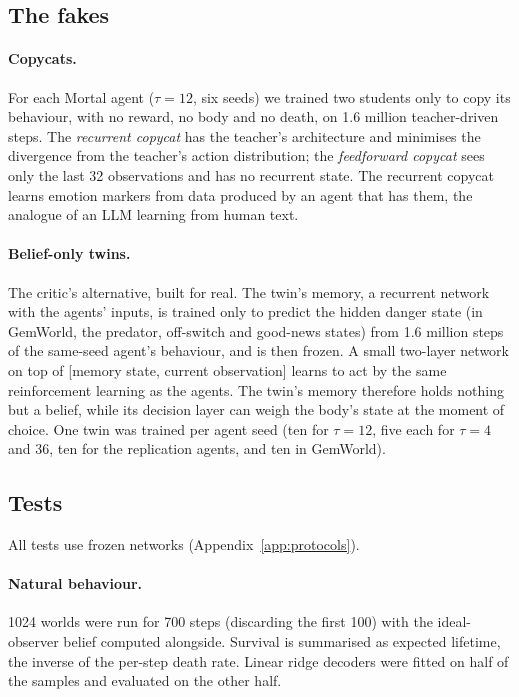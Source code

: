 \documentclass[11pt]{article}
\begin{document}
\subsection{The fakes}
\label{sec:twins}

\paragraph{Copycats.} For each Mortal agent ($\tau=12$, six seeds) we trained two students only to copy its behaviour, with no reward, no body and no death, on 1.6 million teacher-driven steps. The \emph{recurrent copycat} has the teacher's architecture and minimises the divergence from the teacher's action distribution; the \emph{feedforward copycat} sees only the last 32 observations and has no recurrent state. The recurrent copycat learns emotion markers from data produced by an agent that has them, the analogue of an LLM learning from human text.

\paragraph{Belief-only twins.} The critic's alternative, built for real. The twin's memory, a recurrent network with the agents' inputs, is trained only to predict the hidden danger state (in GemWorld, the predator, off-switch and good-news states) from 1.6 million steps of the same-seed agent's behaviour, and is then frozen. A small two-layer network on top of [memory state, current observation] learns to act by the same reinforcement learning as the agents. The twin's memory therefore holds nothing but a belief, while its decision layer can weigh the body's state at the moment of choice. One twin was trained per agent seed (ten for $\tau=12$, five each for $\tau=4$ and 36, ten for the replication agents, and ten in GemWorld).

\subsection{Tests}
\label{sec:probes}

All tests use frozen networks (Appendix~\ref{app:protocols}).

\paragraph{Natural behaviour.} 1024 worlds were run for 700 steps (discarding the first 100) with the ideal-observer belief computed alongside. Survival is summarised as expected lifetime, the inverse of the per-step death rate. Linear ridge decoders were fitted on half of the samples and evaluated on the other half.
\end{document}
